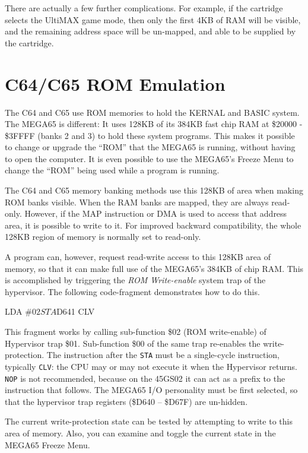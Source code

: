 There are actually a few further complications. For example, if the
cartridge selects the UltiMAX\texttrademark{} game mode, then only the first 4KB
of RAM will be visible, and the remaining address space will be
un-mapped, and able to be supplied by the cartridge.

\section{C64/C65 ROM Emulation}

The C64 and C65 use ROM memories to hold the KERNAL and BASIC system.
The MEGA65 is different: It uses 128KB of its 384KB fast chip RAM at
\$20000 - \$3FFFF (banks 2 and 3) to
hold these system programs. This makes it possible to change or upgrade the
``ROM'' that the MEGA65 is running, without having to open the
computer. It is even possible to use the MEGA65's Freeze Menu to
change the ``ROM'' being used while a program is running.

The C64 and C65 memory banking methods use this 128KB of area when
making ROM banks visible.  When the RAM banks are mapped, they are
always read-only.  However, if the MAP instruction or DMA is used to
access that address area, it is possible to write to it. For improved
backward compatibility, the whole 128KB region of memory is normally
set to read-only.

A program can, however, request read-write access to this
128KB area of memory, so that it can make full use of the MEGA65's
384KB of chip RAM.  This is accomplished by triggering the {\em ROM Write-enable}
system trap of the hypervisor.  The following
code-fragment demonstrates how to do this.

\begin{screencode}
  LDA #$02
  STA $D641
  CLV
\end{screencode}

This fragment works by
calling sub-function \$02 (ROM write-enable) of Hypervisor
trap \$01. Sub-function \$00 of the same trap re-enables the
write-protection. The instruction after the {\tt STA} must be a single-cycle instruction, typically {\tt CLV}: the CPU may or may not execute it when the Hypervisor returns. {\tt NOP} is not recommended, because on the 45GS02 it can act as a prefix to the instruction that follows. The MEGA65
I/O personality must be first selected, so that the hypervisor trap
registers (\$D640 -- \$D67F) are un-hidden.

The current write-protection
state can be tested by attempting to write to this area of memory.
Also, you can examine and toggle the current state in the MEGA65
Freeze Menu.

